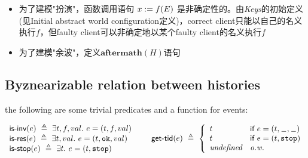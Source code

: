 \documentclass[UTF8, 8pt, a4paper ]{ctexart}
\begin{document}
\begin{small}
\begin{center}
		
		
	
	
	\begin{comment}
		
	
	\subsection{Multiple-Steps of Abstract Global Transition}
	
	\vspace{0.2cm}
	\begin{center}
		$
		\inferrule[AWzero-Step]
		{\ }
		{(\mathbb{W},\mathbb{S}) \longmcircarrow{\ \epsilon\ } (\mathbb{W}, \mathbb{S}) }
		$
		\qquad
		$
		\inferrule[AWe-Steps]
		{(\mathbb{W}, \mathbb{S}) \longcircarrow{\ H_1 \ } (\mathbb{W}'', \mathbb{S}'') \\
			(\mathbb{W}'', \mathbb{S}'') \longmcircarrow{\ H_2\ } (\mathbb{W}', \mathbb{S}') }
		{(\mathbb{W},\mathbb{S}) \longmcircarrow{\ H_1::H_2\ } (\mathbb{W}', \mathbb{S}') }
		$
	\end{center}
	\end{comment}
	
	
	
	\begin{itemize}
		\item 为了建模"扮演"，函数调用语句 $ x \!\!\ :=\ \!\! f(E) $ 是非确定性的。由\textit{Keys}的初始定义(见Initial abstract world configuration定义)，correct client只能以自己的名义执行$ f $，但faulty client可以非确定地以某个faulty client的名义执行$ f $
		\item 为了建模"余波"，定义$ \textbf{aftermath}(H) $语句
	\end{itemize}
	
	\kspace
	
	\subsection{Byznearizable relation between histories}
	
	the following are some trivial predicates and a function for events: 
	
	
	$$
	\begin{array}{l}
		 \textsf{is-inv}(e)\ \triangleq\ \exists t,f,val.\ e = (t,f,val) \\
		 \textsf{is-res}(e)\ \triangleq\ \exists t , val.\  e = (t,\texttt{ok},val) \\
		 \textsf{is-stop}(e)\ \triangleq\ \exists t.\  e = (t, \texttt{stop}) \\		
	\end{array}
	\qquad
	\textsf{get-tid}(e)\  \triangleq\ \left\{
	\begin{array}{ll}
	t & \textsf{if }e = (t, \wildcard, \wildcard)  \\
	t & \textsf{if }e = (t, \texttt{stop})  \\
	\textit{undefined} & \textit{o.w.}
	\end{array}
	\right.$$
	

\end{center}
\end{small}
\end{document}
